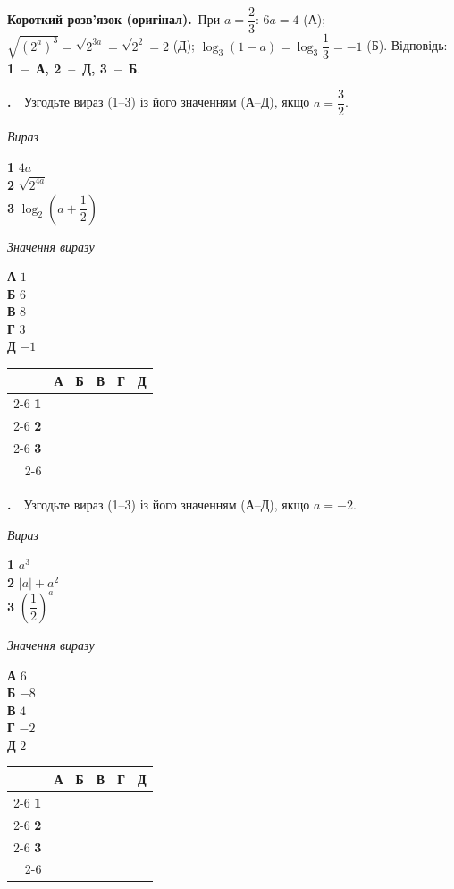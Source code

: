 \documentclass[12pt]{article}
\newcommand{\matchingGrid}{%
    \begingroup
    \renewcommand{\arraystretch}{1.15}
    \setlength{\tabcolsep}{4pt}
    \footnotesize
    \begin{tabular}{r|c|c|c|c|c|}
         \multicolumn{1}{c}{} & \multicolumn{1}{c}{\textbf{А}} & \multicolumn{1}{c}{\textbf{Б}} & \multicolumn{1}{c}{\textbf{В}} & \multicolumn{1}{c}{\textbf{Г}} & \multicolumn{1}{c}{\textbf{Д}} \\ \cline{2-6}
         \textbf{1} & \phantom{X} & \phantom{X} & \phantom{X} & \phantom{X} & \phantom{X} \\ \cline{2-6}
         \textbf{2} & & & & & \\ \cline{2-6}
         \textbf{3} & & & & & \\ \cline{2-6}
    \end{tabular}
    \endgroup
}
\newcounter{zad}
\newcommand{\zadtask}[1]{\stepcounter{zad}\noindent\textbf{\thezad.}\ \ #1\par\vspace{0.2cm}}
\newcommand{\solution}[1]{%
\par\vspace{0.12cm}
\begin{tcolorbox}[colback=titleBg!45, colframe=mainGreen!55, boxrule=0.4pt, arc=2pt,
    left=6pt, right=6pt, top=3pt, bottom=3pt, breakable]
\footnotesize\textbf{Короткий розв'язок (оригінал).}\ #1
\end{tcolorbox}
\par\vspace{0.12cm}
}
\begin{document}
\solution{При $a=\dfrac{2}{3}$: $6a=4$ (А); $\sqrt{(2^a)^3}=\sqrt{2^{3a}}=\sqrt{2^2}=2$ (Д); $\log_3(1-a)=\log_3\dfrac{1}{3}=-1$ (Б). Відповідь: \textbf{1~--~А, 2~--~Д, 3~--~Б}.}
\zadtask{Узгодьте вираз (1--3) із його значенням (А--Д), якщо $a = \dfrac{3}{2}$.

\vspace{0.3cm}
\noindent
\begin{minipage}[t]{0.4\textwidth}
\textit{Вираз}\par\vspace{0.2cm}
\textbf{1} \quad $4a$\\[0.4cm]
\textbf{2} \quad $\sqrt{2^{4a}}$\\[0.4cm]
\textbf{3} \quad $\log_2 \left(a + \dfrac{1}{2}\right)$
\end{minipage}
\hfill
\begin{minipage}[t]{0.32\textwidth}
\textit{Значення виразу}\par\vspace{0.2cm}
\textbf{А} \quad $1$\\[0.25cm]
\textbf{Б} \quad $6$\\[0.25cm]
\textbf{В} \quad $8$\\[0.25cm]
\textbf{Г} \quad $3$\\[0.25cm]
\textbf{Д} \quad $-1$
\end{minipage}
\hfill
\begin{minipage}[t]{0.2\textwidth}
\vspace{0.4cm}
\begin{flushright}\matchingGrid\end{flushright}
\end{minipage}
}
\zadtask{Узгодьте вираз (1--3) із його значенням (А--Д), якщо $a = -2$.

\vspace{0.3cm}
\noindent
\begin{minipage}[t]{0.4\textwidth}
\textit{Вираз}\par\vspace{0.2cm}
\textbf{1} \quad $a^3$\\[0.4cm]
\textbf{2} \quad $|a| + a^2$\\[0.4cm]
\textbf{3} \quad $\left(\dfrac{1}{2}\right)^{a}$
\end{minipage}
\hfill
\begin{minipage}[t]{0.32\textwidth}
\textit{Значення виразу}\par\vspace{0.2cm}
\textbf{А} \quad $6$\\[0.25cm]
\textbf{Б} \quad $-8$\\[0.25cm]
\textbf{В} \quad $4$\\[0.25cm]
\textbf{Г} \quad $-2$\\[0.25cm]
\textbf{Д} \quad $2$
\end{minipage}
\hfill
\begin{minipage}[t]{0.2\textwidth}
\vspace{0.4cm}
\begin{flushright}\matchingGrid\end{flushright}
\end{minipage}
}
\end{document}
